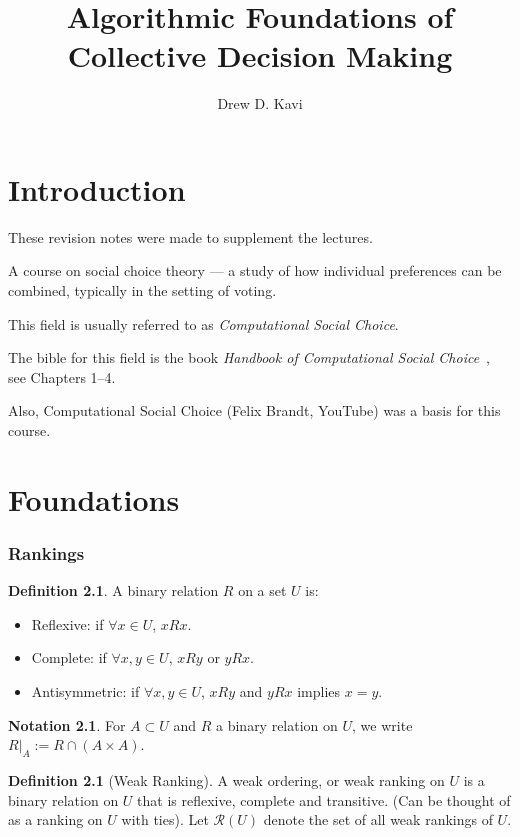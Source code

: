 \documentclass{book}
\title{Algorithmic Foundations of Collective Decision Making}
\author{Drew D. Kavi}
\theoremstyle{plain}
\theoremstyle{definition}
\newtheorem{definition}[theorem]{Definition}
\newtheorem{notation}[theorem]{Notation}
\theoremstyle{remark}
\begin{document}
\maketitle
\tableofcontents


\setlength{\parindent}{0pt}
\setlength{\parskip}{1em}

\chapter{Introduction}

These revision notes were made to supplement the lectures.

A course on social choice theory --- 
a study of how individual preferences can be combined, 
typically in the setting of voting.

This field is usually referred to as 
\emph{Computational Social Choice}.

The bible for 
this field is the book \emph{Handbook of Computational Social Choice}~\cite{brandt2016handbook}, 
see Chapters 1--4.

Also, Computational Social Choice (Felix Brandt, YouTube) 
was a basis for this course.

\chapter{Foundations}

\subsection{Rankings}

\begin{definition}
    A binary relation $R$ on a set $U$ is:
    \begin{itemize}
        \item Reflexive: if $\forall x \in U$, $x R x$.
        \item Complete: if $\forall x, y \in U$, $x R y$ or $y R x$.
        \item Antisymmetric: if $\forall x, y \in U$, $x R y$ and $y R x$ implies $x = y$.
    \end{itemize}
\end{definition}
\begin{notation}
    For $A \subset U$ and 
    $R$ a binary relation on $U$,
    we write $R|_A := R \cap (A \times A)$.
\end{notation}
\begin{definition}[Weak Ranking]
    A weak ordering, or weak ranking on 
    $U$ is a binary relation on 
    $U$ that is reflexive,
    complete and transitive.
    (Can be thought of as a ranking on $U$ with ties).
    Let $\mathcal{R}(U)$ denote the set of 
    all weak rankings of $U$.
\end{definition}
\end{document}
